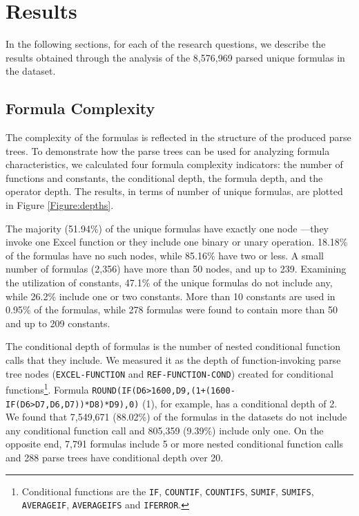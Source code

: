 \documentclass[times]{smrauth}
\begin{document}
\section{Results}
\label{section:results}
In the following sections, for each of the research questions, we describe the results obtained through the analysis of the 8,576,969 parsed unique formulas in the dataset.

\subsection{Formula Complexity}

The complexity of the formulas is reflected in the structure of the produced parse trees. To demonstrate how the parse trees can be used for analyzing formula characteristics, we calculated four formula complexity indicators:  the number of functions and constants, the conditional depth, the formula depth, and the operator depth. The results, in terms of number of unique formulas, are plotted in Figure \ref{Figure:depths}.

The majority (51.94\%) of the unique formulas have exactly one  node ---they invoke one Excel function or they include one binary or unary operation. 18.18\% of the formulas have no such nodes, while 85.16\% have two or less. A small number of formulas (2,356) have more than 50  nodes, and up to 239. Examining the utilization of constants, 47.1\% of the unique formulas do not include any, while 26.2\% include one or two constants. More than 10 constants are used in 0.95\% of the formulas, while 278 formulas were found to contain more than 50 and up to 209 constants.

The conditional depth of formulas is the number of nested conditional function calls that they include. We measured it as the depth of function-invoking parse tree nodes (\texttt{EXCEL-FUNCTION} and \texttt{REF-FUNCTION-COND}) created for conditional functions\footnote{Conditional functions are the \texttt{IF}, \texttt{COUNTIF}, \texttt{COUNTIFS}, \texttt{SUMIF}, \texttt{SUMIFS}, \texttt{AVERAGEIF}, \texttt{AVERAGEIFS} and \texttt{IFERROR}.}. Formula \texttt{ROUND(IF(D6>1600,D9,(1+(1600-IF(D6>D7,D6,D7))*D8)*D9),0)} (1), for example, has a conditional depth of 2. We found that 7,549,671 (88.02\%) of the formulas in the datasets do not include any conditional function call and 805,359 (9.39\%) include only one. On the opposite end, 7,791 formulas include 5 or more nested conditional function calls and 288 parse trees have conditional depth over 20.
 
\end{document}
